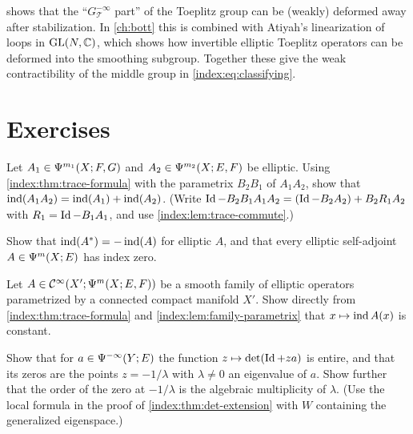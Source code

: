 \begin{remark}\label{index:rem:deform-meaning}
   shows that the ``$G^{-\infty}_{\mathcal T}$
  part'' of the Toeplitz group can be (weakly) deformed away after
  stabilization. In \cref{ch:bott} this is combined with Atiyah's
  linearization of loops in $\operatorname{GL}(N,\mathbb{C})$, which shows how invertible elliptic
  Toeplitz operators can be deformed into the smoothing subgroup. Together
  these give the weak contractibility of the middle group in
  \eqref{index:eq:classifying}.
\end{remark}

\section{Exercises}

\begin{exercise}\label{index:ex:multiplicative}
  Let $A_1\in\Psi^{m_1}(X;F,G)$ and $A_2\in\Psi^{m_2}(X;E,F)$ be elliptic.
  Using \cref{index:thm:trace-formula} with the parametrix $B_2B_1$ of
  $A_1A_2$, show that $\operatorname{ind}(A_1A_2)=\operatorname{ind}(A_1)+\operatorname{ind}(A_2)$. (Write
  $\operatorname{Id}-B_2B_1A_1A_2=(\operatorname{Id}-B_2A_2)+B_2R_1A_2$ with $R_1=\operatorname{Id}-B_1A_1$, and use
  \cref{index:lem:trace-commute}.)
\end{exercise}

\begin{exercise}\label{index:ex:adjoint}
  Show that $\operatorname{ind}(A^*)=-\operatorname{ind}(A)$ for elliptic $A$, and that every elliptic
  self-adjoint $A\in\Psi^{m}(X;E)$ has index zero.
\end{exercise}

\begin{exercise}\label{index:ex:same-symbol-family}
  Let $A\in\mathcal{C}^\infty(X';\Psi^{m}(X;E,F))$ be a smooth family of elliptic
  operators parametrized by a connected compact manifold $X'$. Show directly
  from \cref{index:thm:trace-formula} and
  \cref{index:lem:family-parametrix} that $x\mapsto\operatorname{ind} A(x)$ is constant.
\end{exercise}

\begin{exercise}\label{index:ex:det-properties}
  Show that for $a\in\Psi^{-\infty}(Y;E)$ the function
  $z\mapsto\det(\operatorname{Id}+za)$ is entire, and that its zeros are the points
  $z=-1/\lambda$ with $\lambda\ne0$ an eigenvalue of $a$. Show further that the
  order of the zero at $-1/\lambda$ is the algebraic multiplicity of
  $\lambda$. (Use the local formula in the proof of
  \cref{index:thm:det-extension} with $W$ containing the generalized
  eigenspace.)
\end{exercise}

